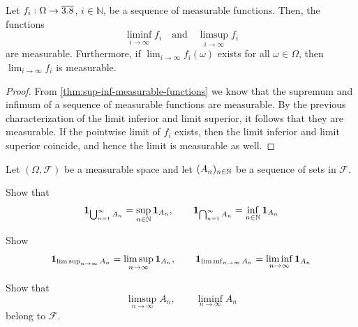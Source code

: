 \begin{theorem}\label{thm:limsup-liminf-measurable-functions}
Let $f_i : \Omega \to \overline{3.8}$, $i \in \mathbb{N}$, be a sequence of measurable functions.
Then, the functions 
\[
\liminf_{i \to \infty} f_i
\quad
\text{and}
\quad
\limsup_{i \to \infty} f_i
\]
are measurable. 
Furthermore, if $\lim_{i \to \infty} f_i(\omega)$ exists for all $\omega \in \Omega$, 
then 
\(
\lim_{i \to \infty} f_i
\)
is measurable.
\end{theorem}
\begin{proof}
From \autoref{thm:sup-inf-measurable-functions} we know that the supremum and infimum of a sequence of measurable functions are measurable.
By the previous characterization of the limit inferior and limit superior, it follows that 
they %
are measurable.
If the pointwise limit of $f_i$ exists, then the limit inferior and limit superior coincide, and hence the limit is measurable as well.
\end{proof}



\begin{exercise} %
Let $(\Omega,\mathcal{F})$ be a measurable space and let $(A_n)_{n \in \mathbb{N}}$ be a sequence of sets in $\mathcal{F}$.
\begin{enumerate}[label={\protect\hyperref[solitem:indicators-limsup-liminf-sets:\arabic*]{(\roman*)}}]
\item \label{exitem:indicators-limsup-liminf-sets:1}
Show that
\[
\mathbf{1}_{\bigcup_{n=1}^{\infty} A_n}
=
\sup_{n \in \mathbb{N}} \mathbf{1}_{A_n},
\qquad
\mathbf{1}_{\bigcap_{n=1}^{\infty} A_n}
=
\inf_{n \in \mathbb{N}} \mathbf{1}_{A_n}
\]
\item \label{exitem:indicators-limsup-liminf-sets:2}
Show 
\[
\mathbf{1}_{\limsup_{n \to \infty} A_n}
=
\limsup_{n \to \infty} \mathbf{1}_{A_n},
\qquad
\mathbf{1}_{\liminf_{n \to \infty} A_n}
=
\liminf_{n \to \infty} \mathbf{1}_{A_n}
\]
\item \label{exitem:indicators-limsup-liminf-sets:3}
Show that
\[
\limsup_{n \to \infty} A_n,
\qquad
\liminf_{n \to \infty} A_n
\]
belong to $\mathcal{F}$.
\qedhere
\end{enumerate}
\end{exercise}


